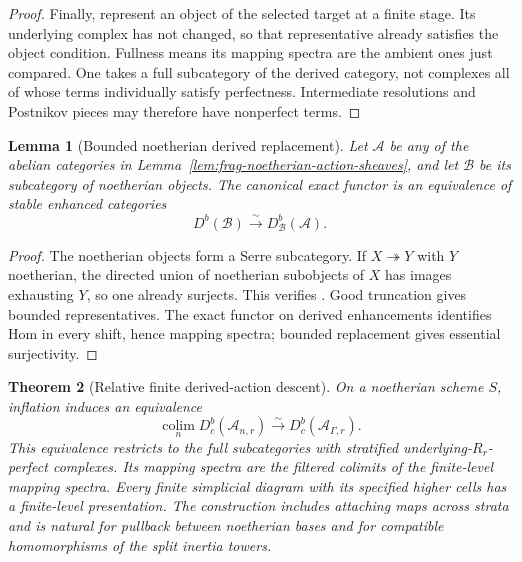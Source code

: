 \documentclass[11pt]{article}
\newtheorem{theorem}{Theorem}[section]
\newtheorem{lemma}[theorem]{Lemma}
\theoremstyle{definition}
\theoremstyle{remark}
\begin{document}
\begin{proof}
Finally, represent an object of the selected target at a finite
stage.  Its underlying complex has not changed, so that representative
already satisfies the object condition.  Fullness means its mapping
spectra are the ambient ones just compared.  One takes a full
subcategory of the derived category, not complexes all of whose
terms individually satisfy perfectness.  Intermediate resolutions
and Postnikov pieces may therefore have nonperfect terms.
\end{proof}

\begin{lemma}[Bounded noetherian derived replacement]
\label{lem:frag-noetherian-derived-replacement}
Let $\mathcal A$ be any of the abelian categories in
Lemma~\ref{lem:frag-noetherian-action-sheaves}, and let $\mathcal B$ be
its subcategory of noetherian objects.  The canonical exact functor is
an equivalence of stable enhanced categories
\[
D^b(\mathcal B)\xrightarrow{\sim}D^b_{\mathcal B}(\mathcal A).
\]
\end{lemma}

\begin{proof}
The noetherian objects form a Serre subcategory.  If $X\twoheadrightarrow Y$
with $Y$ noetherian, the directed union of noetherian subobjects of $X$
has images exhausting $Y$, so one already surjects.  This verifies
\cite[Lemma 13.17.4]{StacksDerivedSerre}.  Good truncation gives
bounded representatives.  The exact functor on derived enhancements
identifies Hom in every shift, hence mapping spectra; bounded
replacement gives essential surjectivity.
\end{proof}

\begin{theorem}[Relative finite derived-action descent]
\label{thm:frag-relative-finite-action-descent}
On a noetherian scheme $S$, inflation induces an equivalence
\begin{equation}
 \operatorname*{colim}_n D_c^b(\mathcal A_{n,r})
 \xrightarrow{\sim}D_c^b(\mathcal A_{\Gamma,r}).
 \label{eq:frag-relative-derived-action-colimit}
\end{equation}
This equivalence restricts to the full subcategories with stratified
underlying-$R_r$-perfect complexes.  Its mapping spectra are the
filtered colimits of the finite-level mapping spectra.  Every finite
simplicial diagram with its specified higher cells has a finite-level
presentation.  The construction includes attaching maps across strata
and is natural for pullback between noetherian bases and for compatible
homomorphisms of the split inertia towers.
\end{theorem}
\end{document}
